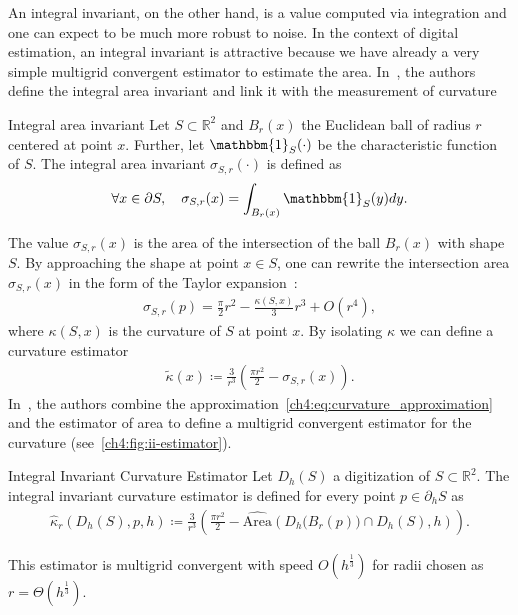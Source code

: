 An integral invariant, on the other hand, is a value computed via integration and one can expect to be much more robust to noise. In the context of digital estimation, an integral invariant is attractive because we have already a very simple multigrid convergent estimator to estimate the area. In~\cite{manay04intinvariant}, the authors define the integral area invariant and link it with the measurement of curvature

\begin{definition}{Integral area invariant}
  Let $S \subset \mathbb{R}^2$ and $B_r(x)$ the Euclidean ball of radius $r$ centered at point $x$. Further, let  $\mathbbm{1}_S(\cdot)$ be the characteristic function of $S$. The integral area invariant $\sigma_{S,r}(\cdot)$ is
  defined as
  \begin{align*}
    \forall x \in \partial S, \quad \sigma_{S,r}(x) = \int_{B_r(x)}{ \mathbbm{1}_S(y) dy}.
  \end{align*}
\end{definition}
%
%
The value $\sigma_{S,r}(x)$ is the area of the intersection of the ball $B_r(x)$ with shape $S$. By approaching the shape at point $x \in S$, one can rewrite the intersection area $\sigma_{S,r}(x)$ in the form of the Taylor expansion~\cite{pottman09intinvariant}:
\begin{align*}
  \sigma_{S,r}(p) = \frac{\pi}{2}r^2 - \frac{\kappa(S,x)}{3}r^3 + O(r^4),
\end{align*}
%
where $\kappa(S,x)$ is the curvature of $S$ at point $x$. By isolating $\kappa$ we can define a curvature estimator
%	
\begin{align}
  \tilde{\kappa}(x) \coloneqq \frac{3}{r^3}\left( \frac{\pi r^2}{2} - \sigma_{S,r}(x) \right).
  \label{ch4:eq:curvature_approximation}
\end{align}
%
In~\cite{coeurjolly13integral}, the authors combine the approximation~\cref{ch4:eq:curvature_approximation} and the estimator of area to define a multigrid convergent estimator for the curvature (see~\cref{ch4:fig:ii-estimator}).

\begin{definition}{Integral Invariant Curvature Estimator}
  Let $D_h(S)$ a digitization of $S \subset \mathbb{R}^2$. The integral invariant curvature estimator is defined for every point $p \in \partial_h S$ as
  \begin{align*}
    \hat{\kappa}_{r}(D_h(S),p,h) \coloneqq \frac{3}{r^3} \left( \frac{\pi r^2}{2} - \widehat{\text{Area}} \left( D_h\big( B_{r} ( p ) \big) \cap D_h(S), h \right) \right).
  \end{align*}
\end{definition}
%
This estimator is multigrid convergent with speed $O(h^\frac{1}{3})$ for radii chosen as $r=\Theta(h^\frac{1}{3})$.  

